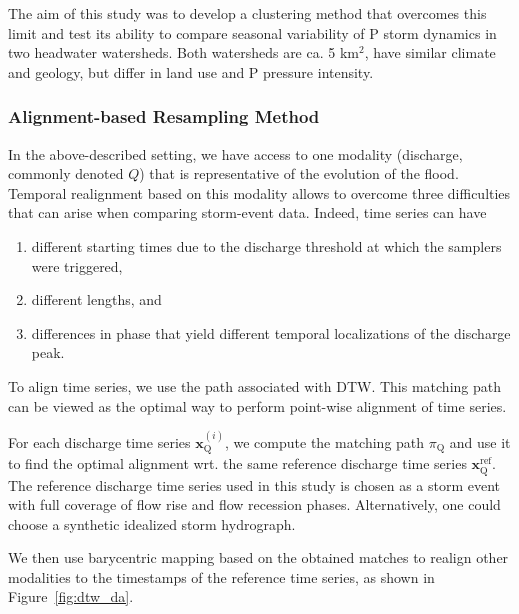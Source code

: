 The aim of this study was to develop a clustering method that overcomes this
limit and test its ability to compare seasonal variability of P storm dynamics
in two headwater watersheds. Both watersheds are ca. 5 km$^2$, have similar
climate and geology, but differ in land use and P pressure intensity.

\subsubsection{Alignment-based Resampling Method}

In the above-described setting, we have access to one modality (discharge,
commonly denoted $Q$) that is representative of the evolution of the flood.
Temporal realignment based on this modality allows to overcome three
difficulties that can arise when comparing storm-event data.
Indeed, time series can have

\begin{enumerate}
\item different starting times due to the discharge threshold at which the
samplers were triggered,
\item different lengths, and
\item differences in phase that yield different temporal localizations of the
discharge peak.
\end{enumerate}

To align time series, we use the path associated with DTW.
This matching path can be viewed as the optimal way to perform point-wise
alignment of time series.

For each discharge time series $\mathbf{x}^{(i)}_\text{Q}$, we compute the
matching path $\pi_\text{Q}$ and use it to find the optimal alignment wrt.
the same reference discharge time series $\mathbf{x}^\text{ref}_\text{Q}$.
The reference discharge time series used in this study is chosen
as a storm event with full coverage of flow rise and flow recession phases.
Alternatively, one could choose a synthetic idealized storm hydrograph.

We then use barycentric mapping based on the obtained matches to realign other
modalities to the timestamps of the reference time series, as shown in
Figure~\ref{fig:dtw_da}.

